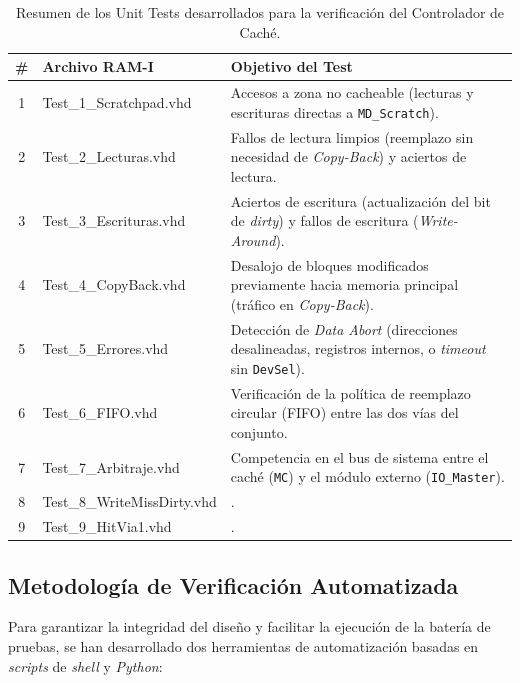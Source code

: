 \documentclass[12pt,a4paper]{article}
\begin{document}
    \begin{table}[H]
    \centering
    \renewcommand{\arraystretch}{1.5}
    \begin{tabularx}{\textwidth}{@{} c >{\small\ttfamily}X X @{}}
    \toprule
    \textbf{\#} & \normalfont\textbf{Archivo RAM-I} & \textbf{Objetivo del Test} \\
    \midrule
    1 & Test\_1\_Scratchpad.vhd & Accesos a zona no cacheable (lecturas y escrituras directas a \texttt{MD\_Scratch}). \\
    2 & Test\_2\_Lecturas.vhd & Fallos de lectura limpios (reemplazo sin necesidad de \textit{Copy-Back}) y aciertos de lectura. \\
    3 & Test\_3\_Escrituras.vhd & Aciertos de escritura (actualización del bit de \textit{dirty}) y fallos de escritura (\textit{Write-Around}). \\
    4 & Test\_4\_CopyBack.vhd & Desalojo de bloques modificados previamente hacia memoria principal (tráfico en \textit{Copy-Back}). \\
    5 & Test\_5\_Errores.vhd & Detección de \textit{Data Abort} (direcciones desalineadas, registros internos, o \textit{timeout} sin \texttt{DevSel}). \\
    6 & Test\_6\_FIFO.vhd & Verificación de la política de reemplazo circular (FIFO) entre las dos vías del conjunto. \\
    7 & Test\_7\_Arbitraje.vhd & Competencia en el bus de sistema entre el caché (\texttt{MC}) y el módulo externo (\texttt{IO\_Master}). \\
    8 & Test\_8\_WriteMissDirty.vhd & . \\
    9 & Test\_9\_HitVia1.vhd & . \\
    
    \bottomrule
    \end{tabularx}
    \caption{Resumen de los Unit Tests desarrollados para la verificación del Controlador de Caché.}
    \end{table}

    \subsection{Metodología de Verificación Automatizada}

Para garantizar la integridad del diseño y facilitar la ejecución de la batería de pruebas, se han desarrollado dos herramientas de automatización basadas en \textit{scripts} de \textit{shell} y \textit{Python}:
\end{document}
